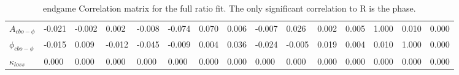 \begin{landscape}
\begin{table}[]
\begin{tabular*}{\linewidth}{@{\extracolsep{\fill}}lLBLLLLLLLLLLLL}
$A_{cbo-\phi}$     & -0.021 & -0.002 & 0.002 & -0.008 & -0.074 & 0.070 & 0.006 & -0.007 & 0.026 & 0.002 & 0.005 & 1.000 & 0.010 & 0.000  \\
$\phi_{cbo-\phi}$  & -0.015 & 0.009 & -0.012 & -0.045 & -0.009 & 0.004 & 0.036 & -0.024 & -0.005 & 0.019 & 0.004 & 0.010 & 1.000 & 0.000  \\
$\kappa_{loss}$    & 0.000 & 0.000 & 0.000 & 0.000 & 0.000 & 0.000 & 0.000 & 0.000 & 0.000 & 0.000 & 0.000 & 0.000 & 0.000 & 0.000  \\
  \bottomrule
\end{tabular*}
\caption[]{endgame Correlation matrix for the full ratio fit. The only significant correlation to R is the \gmtwo phase.}
\label{Tab:CorrMat}
\end{table}
\end{landscape}






